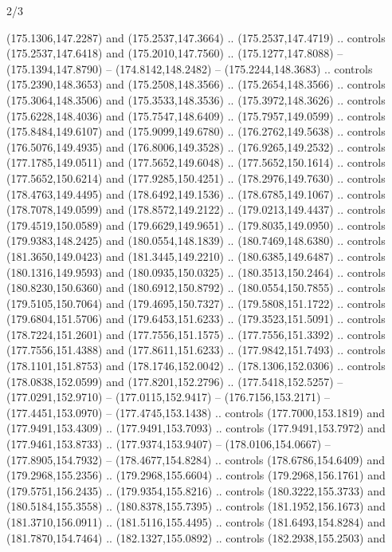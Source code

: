 \begin{flagdescription}{2/3}
\begin{scope}[xshift=0.5\flaglength,yshift=0.5\flagwidth,scale=\flagwidth/180]
\begin{scope}[y=0.8pt, x=0.8pt, yscale=-1,shift={(-168.75,-108.75)}]
  (175.1306,147.2287) and (175.2537,147.3664) .. (175.2537,147.4719) .. controls
  (175.2537,147.6418) and (175.2010,147.7560) .. (175.1277,147.8088) --
  (175.1394,147.8790) -- (174.8142,148.2482) -- (175.2244,148.3683) .. controls
  (175.2390,148.3653) and (175.2508,148.3566) .. (175.2654,148.3566) .. controls
  (175.3064,148.3506) and (175.3533,148.3536) .. (175.3972,148.3626) .. controls
  (175.6228,148.4036) and (175.7547,148.6409) .. (175.7957,149.0599) .. controls
  (175.8484,149.6107) and (175.9099,149.6780) .. (176.2762,149.5638) .. controls
  (176.5076,149.4935) and (176.8006,149.3528) .. (176.9265,149.2532) .. controls
  (177.1785,149.0511) and (177.5652,149.6048) .. (177.5652,150.1614) .. controls
  (177.5652,150.6214) and (177.9285,150.4251) .. (178.2976,149.7630) .. controls
  (178.4763,149.4495) and (178.6492,149.1536) .. (178.6785,149.1067) .. controls
  (178.7078,149.0599) and (178.8572,149.2122) .. (179.0213,149.4437) .. controls
  (179.4519,150.0589) and (179.6629,149.9651) .. (179.8035,149.0950) .. controls
  (179.9383,148.2425) and (180.0554,148.1839) .. (180.7469,148.6380) .. controls
  (181.3650,149.0423) and (181.3445,149.2210) .. (180.6385,149.6487) .. controls
  (180.1316,149.9593) and (180.0935,150.0325) .. (180.3513,150.2464) .. controls
  (180.8230,150.6360) and (180.6912,150.8792) .. (180.0554,150.7855) .. controls
  (179.5105,150.7064) and (179.4695,150.7327) .. (179.5808,151.1722) .. controls
  (179.6804,151.5706) and (179.6453,151.6233) .. (179.3523,151.5091) .. controls
  (178.7224,151.2601) and (177.7556,151.1575) .. (177.7556,151.3392) .. controls
  (177.7556,151.4388) and (177.8611,151.6233) .. (177.9842,151.7493) .. controls
  (178.1101,151.8753) and (178.1746,152.0042) .. (178.1306,152.0306) .. controls
  (178.0838,152.0599) and (177.8201,152.2796) .. (177.5418,152.5257) --
  (177.0291,152.9710) -- (177.0115,152.9417) -- (176.7156,153.2171) --
  (177.4451,153.0970) -- (177.4745,153.1438) .. controls (177.7000,153.1819) and
  (177.9491,153.4309) .. (177.9491,153.7093) .. controls (177.9491,153.7972) and
  (177.9461,153.8733) .. (177.9374,153.9407) -- (178.0106,154.0667) --
  (177.8905,154.7932) -- (178.4677,154.8284) .. controls (178.6786,154.6409) and
  (179.2968,155.2356) .. (179.2968,155.6604) .. controls (179.2968,156.1761) and
  (179.5751,156.2435) .. (179.9354,155.8216) .. controls (180.3222,155.3733) and
  (180.5184,155.3558) .. (180.8378,155.7395) .. controls (181.1952,156.1673) and
  (181.3710,156.0911) .. (181.5116,155.4495) .. controls (181.6493,154.8284) and
  (181.7870,154.7464) .. (182.1327,155.0892) .. controls (182.2938,155.2503) and

\end{scope}
\end{scope}
\end{flagdescription}
